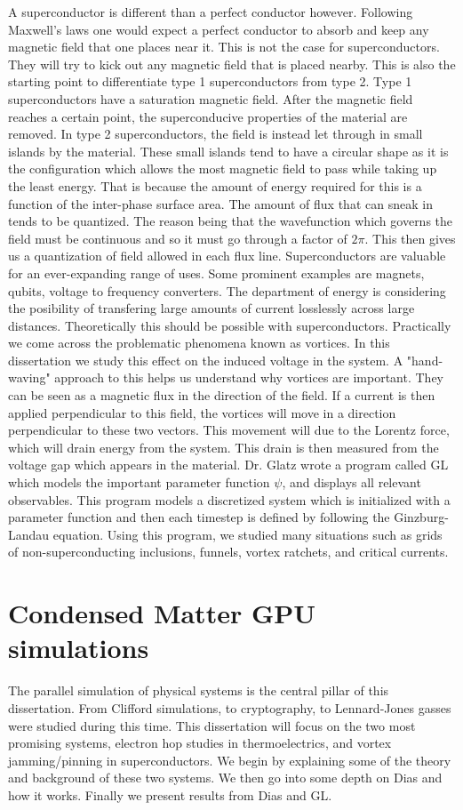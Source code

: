  A superconductor is different than a perfect conductor however. Following Maxwell's laws one would expect a perfect conductor to absorb and keep any magnetic field that one places near it. This is not the case for superconductors. They will try to kick out any magnetic field that is placed nearby. This is also the starting point to differentiate type 1 superconductors from type 2. Type 1 superconductors have a saturation magnetic field. After the magnetic field reaches a certain point, the superconducive properties of the material are removed. In type 2 superconductors, the field is instead let through in small islands by the material. These small islands tend to have a circular shape as it is the configuration which allows the most magnetic field to pass while taking up the least energy. That is because the amount of energy required for this is a function of the inter-phase surface area. The amount of flux that can sneak in tends to be quantized. The reason being that the wavefunction which governs the field must be continuous and so it must go through a factor of $2\pi$. This then gives us a quantization of field allowed in each flux line.  
Superconductors are valuable for an ever-expanding range of uses. Some prominent examples are magnets, qubits, voltage to frequency converters. The department of energy is considering the posibility of transfering large amounts of current losslessly across large distances. Theoretically this should be possible with superconductors. Practically we come across the problematic phenomena known as vortices.  In this dissertation we study this effect on the induced voltage in the system. A "hand-waving" approach to this helps us understand why vortices are important. They can be seen as a magnetic flux in the direction of the field. If a current is then applied perpendicular to this field, the vortices will move in a direction perpendicular to these two vectors. This movement will due to the Lorentz force, which will drain energy from the system. This drain is then measured from the voltage gap which appears in the material. Dr. Glatz wrote a program called {\sc GL} which models the important parameter function $\psi$, and displays all relevant observables. This program models a discretized system which is initialized with a parameter function and then each timestep is defined by following the Ginzburg-Landau equation. Using this program, we studied many situations such as grids of non-superconducting inclusions, funnels, vortex ratchets, and critical currents. 

\section{Condensed Matter GPU simulations}
The parallel simulation of physical systems is the central pillar of this dissertation. From Clifford simulations, to cryptography, to Lennard-Jones gasses were studied during this time. This dissertation will focus on the two most promising systems, electron hop studies in thermoelectrics, and vortex jamming/pinning in superconductors. We begin by explaining some of the theory and background of these two systems. We then go into some depth on Dias and how it works. Finally we present results from Dias and GL. 

